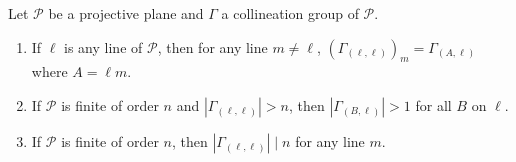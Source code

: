 Let $\mathcal{P}$ be a projective plane and $\Gamma$ a collineation group of $\mathcal{P}$.
\begin{enumerate}
\item[(i)] If $\ell$ is any line of $\mathcal{P}$, then for any line $m \neq \ell$, $(\Gamma_{(\ell,\ell)})_m = \Gamma_{(A,\ell)}$ where $A = \ell m$.
\item[(ii)] If $\mathcal{P}$ is finite of order $n$ and $|\Gamma_{(\ell,\ell)}| > n$, then $|\Gamma_{(B,\ell)}| > 1$ for all $B$ on $\ell$.
\item[(iii)] If $\mathcal{P}$ is finite of order $n$, then $|\Gamma_{(\ell,\ell)}| \mid n$ for any line $m$.
\end{enumerate}
